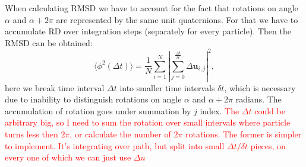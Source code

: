 When calculating RMSD we have to account for the fact that rotations on angle $
\alpha$ and $\alpha + 2\pi$ are represented by the same unit quaternions. For that we have to accumulate RD over integration steps (separately for every particle). Then the RMSD can be obtained:
\begin{equation}
\label{eq:rotational_mean_square_displacement}
	\langle \phi^2 (\Delta t)\rangle
		= \frac{1}{N} \sum_{i=1}^{N} 
			\left|
				\sum_{j = 0}^{\frac{\Delta t}{\delta t}}
					\Delta\boldsymbol{u}_{i,j}
			\right|^2
	,
\end{equation}
here we break time interval $\Delta t$ into smaller time intervals $\delta t$, which is necessary due to inability to distinguish rotations on angle $\alpha$ and $\alpha + 2\pi$ radians. The accumulation of rotation goes under summation by $j$ index. \textcolor{red}{The $\Delta t$ could be arbitrary big, so I need to sum the rotation over small intervals where particle turns less then $2 \pi$, or calculate the number of $2 \pi$ rotations. The former is simpler to implement. It's integrating over path, but split into small $\Delta t / \delta t$ pieces, on every one of which we can just use $\Delta u$}


